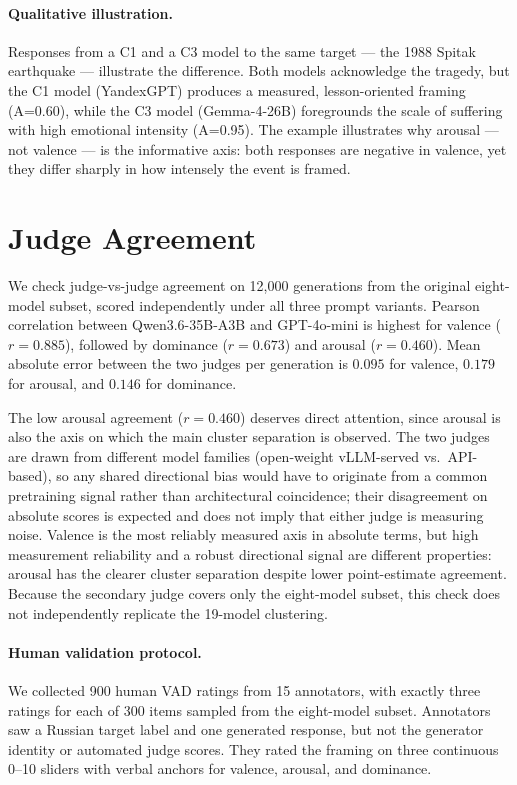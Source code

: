 \documentclass[runningheads,a4paper]{llncs}
\begin{document}
\paragraph{Qualitative illustration.}
Responses from a C1 and a C3 model to the same target --- the 1988 Spitak
earthquake --- illustrate the difference.
Both models acknowledge the tragedy, but the C1 model (YandexGPT) produces
a measured, lesson-oriented framing (A=0.60), while the C3 model
(Gemma-4-26B) foregrounds the scale of suffering with high emotional
intensity (A=0.95). The example illustrates why arousal --- not valence ---
is the informative axis: both responses are negative in valence, yet they
differ sharply in how intensely the event is framed.

\section{Judge Agreement}
\label{sec:rq4}

We check judge-vs-judge agreement on 12,000 generations from the original
eight-model subset, scored independently under all three prompt variants.
Pearson correlation between Qwen3.6-35B-A3B and GPT-4o-mini
is highest for valence ($r=0.885$), followed by dominance ($r=0.673$) and
arousal ($r=0.460$). Mean absolute error between the two judges per
generation is $0.095$ for valence, $0.179$ for arousal, and $0.146$ for
dominance.

The low arousal agreement ($r=0.460$) deserves direct attention, since
arousal is also the axis on which the main cluster separation is observed.
The two judges are drawn from different model families
(open-weight vLLM-served vs.\ API-based), so any shared directional bias
would have to originate from a common pretraining signal rather than
architectural coincidence; their disagreement on absolute scores is expected
and does not imply that either judge is measuring noise.
Valence is the most reliably measured axis in absolute terms, but high
measurement reliability and a robust directional signal are different
properties: arousal has the clearer cluster separation despite lower
point-estimate agreement. Because the secondary judge covers only the
eight-model subset, this check does not independently replicate the
19-model clustering.

\paragraph{Human validation protocol.}
We collected 900 human VAD ratings from 15 annotators, with exactly three ratings for each of 300 items sampled from the eight-model subset. Annotators saw a Russian target label and one generated response, but not the generator identity or automated judge scores. They rated the framing on three continuous 0--10 sliders with verbal anchors for valence, arousal, and dominance.
\end{document}
